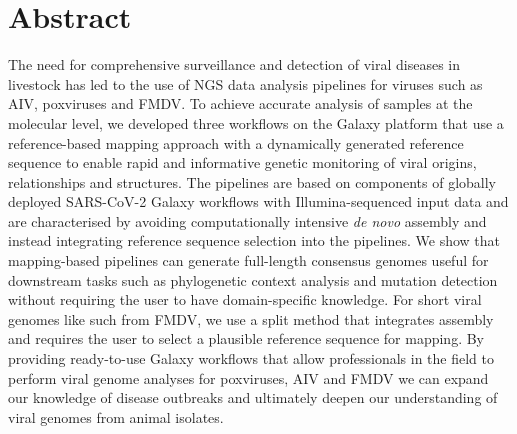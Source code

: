 \chapter*{Abstract}
The need for comprehensive surveillance and detection of viral diseases in livestock has led to the use of \ac{NGS} data analysis pipelines for viruses such as \ac{AIV}, poxviruses and \ac{FMDV}. To achieve accurate analysis of samples at the molecular level, we developed three workflows on the Galaxy platform that use a reference-based mapping approach with a dynamically generated reference sequence to enable rapid and informative genetic monitoring of viral origins, relationships and structures. The pipelines are based on components of globally deployed SARS-CoV-2 Galaxy workflows with Illumina-sequenced input data and are characterised by avoiding computationally intensive \textit{de novo} assembly and instead integrating reference sequence selection into the pipelines. We show that mapping-based pipelines can generate full-length consensus genomes useful for downstream tasks such as phylogenetic context analysis and mutation detection without requiring the user to have domain-specific knowledge. For short viral genomes like such from FMDV, we use a split method that integrates assembly and requires the user to select a plausible reference sequence for mapping. By providing ready-to-use Galaxy workflows that allow professionals in the field to perform viral genome analyses for poxviruses, AIV and FMDV we can expand our knowledge of disease outbreaks and ultimately deepen our understanding of viral genomes from animal isolates.